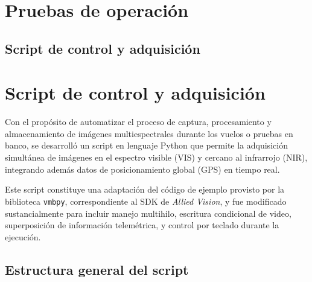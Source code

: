     
    



\section{Pruebas de operación}
  \subsection{Script de control y adquisición}

    \section{Script de control y adquisición}
    \label{sec:script_control_adquisicion}
    
    Con el propósito de automatizar el proceso de captura, procesamiento y almacenamiento de imágenes multiespectrales durante los vuelos o pruebas en banco, se desarrolló un script en lenguaje Python que permite la adquisición simultánea de imágenes en el espectro visible (VIS) y cercano al infrarrojo (NIR), integrando además datos de posicionamiento global (GPS) en tiempo real.
    
    \noindent Este script constituye una adaptación del código de ejemplo provisto por la biblioteca \texttt{vmbpy}, correspondiente al SDK de \textit{Allied Vision}, y fue modificado sustancialmente para incluir manejo multihilo, escritura condicional de video, superposición de información telemétrica, y control por teclado durante la ejecución.
    
    \subsection{Estructura general del script}
    
